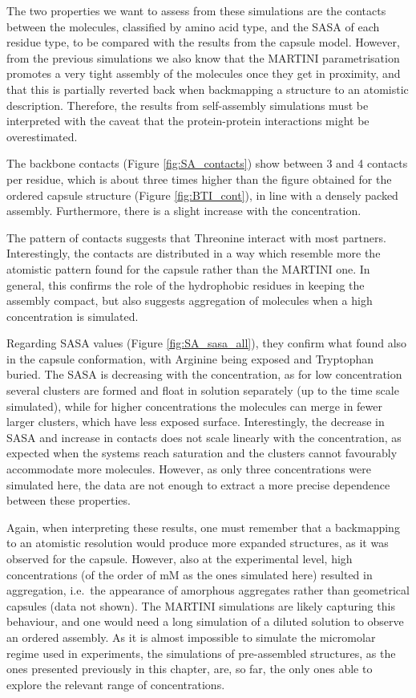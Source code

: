 The two properties we want to assess from these simulations are the contacts between the molecules, classified by amino acid type, and the SASA of each residue type, to be compared with the results from the capsule model. However, from the previous simulations we also know that the MARTINI parametrisation promotes a very tight assembly of the molecules once they get in proximity, and that this is partially reverted back when backmapping a structure to an atomistic description. Therefore, the results from self-assembly simulations must be interpreted with the caveat that the protein-protein interactions might be overestimated.

The backbone contacts (Figure \ref{fig:SA_contacts}) show between 3 and 4 contacts per residue, which is about three times higher than the figure obtained for the ordered capsule structure (Figure \ref{fig:BTI_cont}), in line with a densely packed assembly.
%
Furthermore, there is a slight increase with the concentration.

The pattern of contacts suggests that Threonine interact with most partners. Interestingly, the contacts are distributed in a way which resemble more the atomistic pattern found for the capsule rather than the MARTINI one. In general, this confirms the role of the hydrophobic residues in keeping the assembly compact, but also suggests aggregation of molecules when a high concentration is simulated.

Regarding SASA values (Figure \ref{fig:SA_sasa_all}), they confirm what found also in the capsule conformation, with Arginine being exposed and Tryptophan buried. The SASA is decreasing with the concentration, as for low concentration several clusters are formed and float in solution separately (up to the time scale simulated), while for higher concentrations the molecules can merge in fewer larger clusters, which have less exposed surface.
%
Interestingly, the decrease in SASA and increase in contacts does not scale linearly with the concentration, as expected when the systems reach saturation and the clusters cannot favourably accommodate more molecules. However, as only three concentrations were simulated here, the data are not enough to extract a more precise dependence between these properties.

Again, when interpreting these results, one must remember that a backmapping to an atomistic resolution would produce more expanded structures, as it was observed for the capsule. However, also at the experimental level, high concentrations (of the order of mM as the ones simulated here) resulted in aggregation, i.e.\ the appearance of amorphous aggregates rather than geometrical capsules (data not shown). The MARTINI simulations are likely capturing this behaviour, and one would need a long simulation of a diluted solution to observe an ordered assembly. As it is almost impossible to simulate the micromolar regime used in experiments, the simulations of pre-assembled structures, as the ones presented previously in this chapter, are, so far, the only ones able to explore the relevant range of concentrations.

